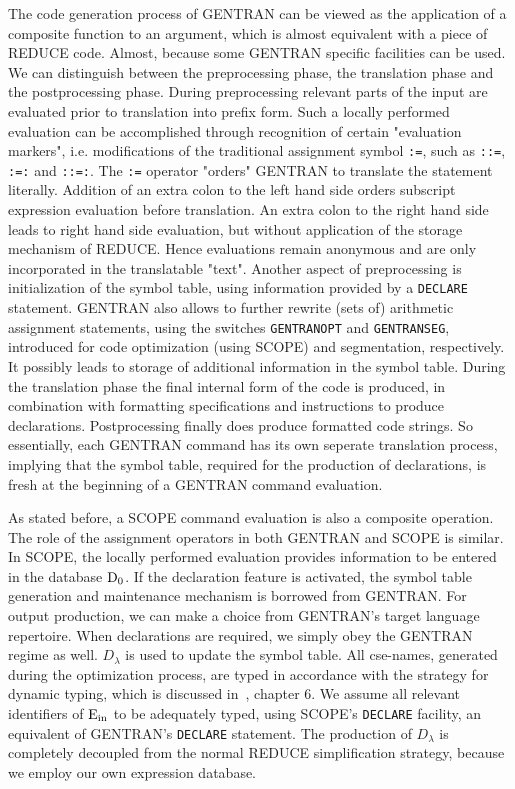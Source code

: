 The code generation process of GENTRAN can be viewed as the application
of a composite function to an argument, which is almost equivalent with a
piece of REDUCE code. Almost, because some GENTRAN specific facilities
can be used. We can distinguish between the preprocessing phase,
the translation phase and the postprocessing phase.
During preprocessing relevant parts of the input are evaluated prior to
translation into prefix form. Such a locally performed evaluation can be
accomplished through recognition of certain "evaluation markers", i.e.
modifications of the traditional assignment symbol {\tt :=},
such as {\tt ::=}, {\tt :=:} and {\tt ::=:}. The {\tt :=} operator
"orders" GENTRAN to translate the statement literally. Addition of an extra
colon to the left hand side orders subscript expression evaluation before
translation. An extra colon to the right hand side leads to right hand side
evaluation, but without application of the storage mechanism of REDUCE.
Hence evaluations
remain anonymous and are only incorporated in the translatable "text".
Another aspect of preprocessing is initialization of the symbol table,
using information provided by a {\tt DECLARE} statement.
GENTRAN also allows to further rewrite (sets of) arithmetic assignment
statements, using the switches {\tt GENTRANOPT} and {\tt GENTRANSEG},
introduced for code optimization (using SCOPE) and segmentation, respectively.
It possibly leads to storage of additional information in the symbol table.
During the translation phase the final internal form
of the code is produced, in combination with formatting specifications and
instructions to produce declarations.
Postprocessing finally does produce formatted code strings. So essentially,
each GENTRAN command has its own seperate translation process, implying that
the symbol table, required for the production of declarations, is fresh
at the beginning of a GENTRAN command evaluation.

As stated before, a SCOPE command evaluation is also a composite operation.
The role of the assignment operators in both GENTRAN and SCOPE is similar.
In SCOPE, the locally performed evaluation provides
information to be entered in the database ${\rm D_0}$.
If the declaration feature is activated, the symbol table generation and
maintenance mechanism is borrowed from GENTRAN.
For output production, we can make a choice from
GENTRAN's target language repertoire. When declarations are required, we simply
obey the GENTRAN regime as well. ${D_{\lambda}}$ is used to update the symbol
table. All cse-names, generated during the optimization process, are typed in
accordance with the strategy for dynamic typing, which is discussed
in~\cite{Aho:86}, chapter 6. We assume all relevant identifiers
of ${\rm E_{in}}$ to be adequately typed, using SCOPE's {\tt DECLARE} facility,
an equivalent of GENTRAN's {\tt DECLARE} statement. The
production of ${D_{\lambda}}$ is completely decoupled from the normal
REDUCE simplification strategy, because we employ our own expression database.

